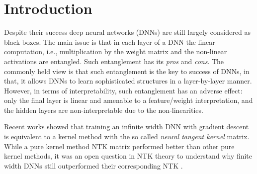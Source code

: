 \section{Introduction}\label{sec:intro}
Despite their success deep neural networks (DNNs) are still largely considered as black boxes.  The main issue is that in each layer of a DNN the linear computation, i.e., multiplication by the weight matrix  and the non-linear activations are entangled. Such entanglement has its \emph{pros} and \emph{cons}. The commonly held view  is that such entanglement is the key to success of DNNs, in that, it allows DNNs to learn sophisticated structures in a layer-by-layer manner. However, in terms of interpretability, such entanglement has an adverse effect: only the final layer is linear and amenable to a feature/weight interpretation, and the hidden layers are non-interpretable due to the non-linearities. 

Recent works \citep{ntk,arora2019exact,cao2019generalization} showed that training an infinite width DNN with gradient descent is equivalent to a kernel method with the so called \emph{neural tangent kernel} matrix. While a pure kernel method NTK matrix performed better than other pure kernel methods, it was an open question in NTK theory to understand why finite width DNNs still outperformed their corresponding NTK \citep{arora2019exact}. %

